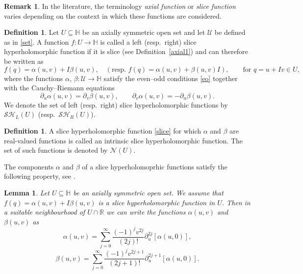 \documentclass[reqno,11pt]{amsart}
\numberwithin{equation}{section}
\newtheorem{lemma}[theorem]{Lemma}
\theoremstyle{definition}
\newtheorem{remark}[theorem]{{\bf Remark}}
\newtheorem{definition}[theorem]{Definition}
\begin{document}
\begin{remark}
	In the literature, the terminology \emph{axial function} or \emph{slice function} varies depending on the context in which these functions are considered.
\end{remark}

\begin{definition}
\label{sh}
	Let $U \subseteq \mathbb{H}$ be an axially symmetric open set and let $\mathcal{U}$ be defined as in \eqref{set}.
	A function $f: U \to \mathbb{H}$ is called a left (resp.\ right) slice hyperholomorphic function if it is slice (see Definition~\ref{axial1}) and can therefore be written as
	\begin{equation}
		\label{slice}
		f(q)=\alpha(u,v)+I \beta(u,v),
		\quad
		\left(\text{resp. } f(q)=\alpha(u,v)+ \beta(u,v)I\right),
		\qquad \text{for } q=u+Iv \in U,
	\end{equation}
	where the functions $\alpha$, $\beta : \mathcal{U} \to \mathbb{H}$ satisfy the even--odd conditions \eqref{eo} together with the Cauchy--Riemann equations
	\begin{equation}
		\partial_u \alpha(u,v)=\partial_v \beta(u,v),
		\qquad
		\partial_v \alpha(u,v)=-\partial_u \beta(u,v).
	\end{equation}
	We denote the set of left (resp.\ right) slice hyperholomorphic functions by $\mathcal{SH}_L(U)$ (resp.\ $\mathcal{SH}_R(U)$).
\end{definition}

\begin{definition}
	A slice hyperholomorphic function \eqref{slice} for which $\alpha$ and $\beta$ are real-valued functions is called an intrinsic slice hyperholomorphic function. The set of such functions is denoted by $\mathcal{N}(U)$.
\end{definition}



The components $\alpha$ and $\beta$ of a slice hyperholomoprhic functions satisfy the following property, see \cite{CDP25,CDS2025}.
\begin{lemma}
\label{comp}
Let $U \subseteq \mathbb{H}$ be an axially symmetric open set. We assume that $f(q)=\alpha(u,v)+I\beta(u,v)$ is a slice hyperholomorphic function in $U$. Then in a suitable neighbourhood of $U \cap \mathbb{R}$ we can write the functions $\alpha(u,v)$ and $\beta(u,v)$ as
$$\alpha(u,v)= \sum_{j=0}^\infty \frac{(-1)^j v^{2j}}{(2j)!} \partial_u^{2j}[\alpha(u,0)],$$
$$\beta(u,v)= \sum_{j=0}^\infty \frac{(-1)^j v^{2j+1}}{(2j+1)!} \partial_u^{2j+1}[\alpha(u,0)].$$
\end{lemma}
\end{document}
